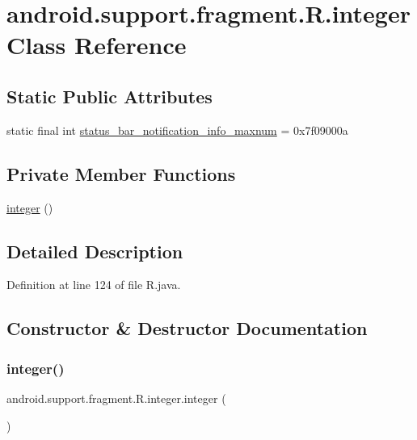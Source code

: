 \hypertarget{classandroid_1_1support_1_1fragment_1_1_r_1_1integer}{}\section{android.\+support.\+fragment.\+R.\+integer Class Reference}
\label{classandroid_1_1support_1_1fragment_1_1_r_1_1integer}
\subsection*{Static Public Attributes}
\begin{DoxyCompactItemize}
\item 
static final int \mbox{\hyperlink{classandroid_1_1support_1_1fragment_1_1_r_1_1integer_ad45b5b452400c150732cf1ffbf992c84}{status\+\_\+bar\+\_\+notification\+\_\+info\+\_\+maxnum}} = 0x7f09000a
\end{DoxyCompactItemize}
\subsection*{Private Member Functions}
\begin{DoxyCompactItemize}
\item 
\mbox{\hyperlink{classandroid_1_1support_1_1fragment_1_1_r_1_1integer_aabea820f4c836e2178c11cdbdbe0bef7}{integer}} ()
\end{DoxyCompactItemize}


\subsection{Detailed Description}


Definition at line 124 of file R.\+java.



\subsection{Constructor \& Destructor Documentation}
\mbox{\label{classandroid_1_1support_1_1fragment_1_1_r_1_1integer_aabea820f4c836e2178c11cdbdbe0bef7}} 
\subsubsection{\texorpdfstring{integer()}{integer()}}
{\footnotesize\ttfamily android.\+support.\+fragment.\+R.\+integer.\+integer (\begin{DoxyParamCaption}{ }\end{DoxyParamCaption})\hspace{0.3cm}{\ttfamily [private]}}



